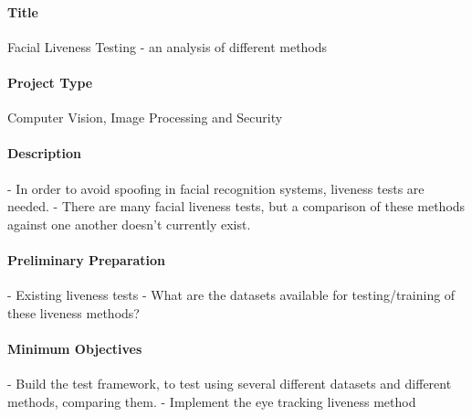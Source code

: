 \documentclass{article}
\begin{document}
    
    \paragraph{Title}
        Facial Liveness Testing - an analysis of different methods
    \paragraph{Project Type}
        Computer Vision, Image Processing and Security
    \paragraph{Description}
        - In order to avoid spoofing in facial recognition systems, liveness tests are needed.
        - There are many facial liveness tests, but a comparison of these methods against one another doesn't currently exist.
    \paragraph{Preliminary Preparation}
        \begin{itemize}
            - Existing liveness tests
            - What are the datasets available for testing/training of these liveness methods?
        \end{itemize}
    \paragraph{Minimum Objectives}
        \begin{itemize}
            - Build the test framework, to test using several different datasets and different methods, comparing them.
            - Implement the eye tracking liveness method
        \end{itemize}
\end{document}
